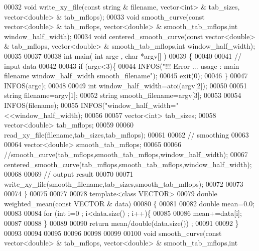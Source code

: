 \begin{DoxyCode}
00032 \textcolor{keywordtype}{void} write\_xy\_file(\textcolor{keyword}{const} \textcolor{keywordtype}{string} & filename, vector<int> & tab\_sizes, vector<double> & tab\_mflops);
00033 \textcolor{keywordtype}{void} smooth\_curve(\textcolor{keyword}{const} vector<double> & tab\_mflops, vector<double> & smooth\_tab\_mflops,\textcolor{keywordtype}{int} 
      window\_half\_width);
00034 \textcolor{keywordtype}{void} centered\_smooth\_curve(\textcolor{keyword}{const} vector<double> & tab\_mflops, vector<double> & smooth\_tab\_mflops,\textcolor{keywordtype}{int} 
      window\_half\_width);
00035 
00037 
00038 \textcolor{keywordtype}{int} main( \textcolor{keywordtype}{int} argc , \textcolor{keywordtype}{char} *argv[] )
00039 \{
00040 
00041   \textcolor{comment}{// input data}
00042 
00043   \textcolor{keywordflow}{if} (argc<3)\{
00044     INFOS(\textcolor{stringliteral}{"!!! Error ... usage : main filename window\_half\_width smooth\_filename"});
00045     exit(0);
00046   \}
00047   INFOS(argc);
00048 
00049   \textcolor{keywordtype}{int} window\_half\_width=atoi(argv[2]);
00050 
00051   \textcolor{keywordtype}{string} filename=argv[1];
00052   \textcolor{keywordtype}{string} smooth\_filename=argv[3];
00053   
00054   INFOS(filename);
00055   INFOS(\textcolor{stringliteral}{"window\_half\_width="}<<window\_half\_width);
00056 
00057   vector<int> tab\_sizes;
00058   vector<double> tab\_mflops;
00059 
00060   read\_xy\_file(filename,tab\_sizes,tab\_mflops);
00061 
00062   \textcolor{comment}{// smoothing}
00063 
00064   vector<double> smooth\_tab\_mflops;
00065 
00066   \textcolor{comment}{//smooth\_curve(tab\_mflops,smooth\_tab\_mflops,window\_half\_width);}
00067   centered\_smooth\_curve(tab\_mflops,smooth\_tab\_mflops,window\_half\_width);
00068 
00069   \textcolor{comment}{// output result}
00070 
00071   write\_xy\_file(smooth\_filename,tab\_sizes,smooth\_tab\_mflops);
00072   
00073 
00074 \}
00075 
00077 
00078 \textcolor{keyword}{template}<\textcolor{keyword}{class} VECTOR>
00079 \textcolor{keywordtype}{double} weighted\_mean(\textcolor{keyword}{const} VECTOR & data)
00080 \{
00081 
00082   \textcolor{keywordtype}{double} mean=0.0;
00083   
00084   \textcolor{keywordflow}{for} (\textcolor{keywordtype}{int} i=0 ; i<data.size() ; i++)\{
00085 
00086     mean+=data[i];
00087 
00088   \}
00089 
00090   \textcolor{keywordflow}{return} mean/double(data.size()) ;
00091 
00092 \}    
00093 
00094 
00095 
00096 
00098 
00099 
00100 \textcolor{keywordtype}{void} smooth\_curve(\textcolor{keyword}{const} vector<double> & tab\_mflops, vector<double> & smooth\_tab\_mflops,\textcolor{keywordtype}{int} 

\end{DoxyCode}
